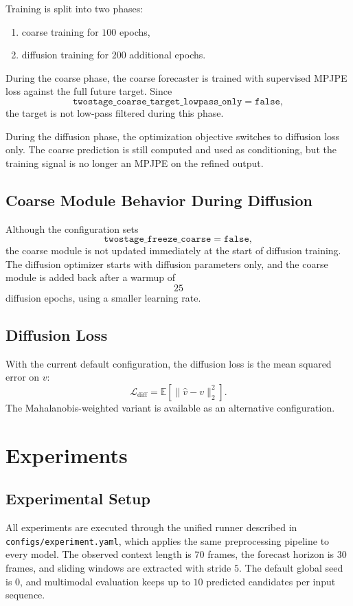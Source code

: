 \documentclass[11pt]{article}
\begin{document}
Training is split into two phases:

\begin{enumerate}
\item coarse training for $100$ epochs,
\item diffusion training for $200$ additional epochs.
\end{enumerate}

During the coarse phase, the coarse forecaster is trained with supervised MPJPE loss against the full future target. Since
\[
\texttt{twostage\_coarse\_target\_lowpass\_only} = \texttt{false},
\]
the target is not low-pass filtered during this phase.

During the diffusion phase, the optimization objective switches to diffusion loss only. The coarse prediction is still computed and used as conditioning, but the training signal is no longer an MPJPE on the refined output.

\subsection{Coarse Module Behavior During Diffusion}

Although the configuration sets
\[
\texttt{twostage\_freeze\_coarse} = \texttt{false},
\]
the coarse module is not updated immediately at the start of diffusion training. The diffusion optimizer starts with diffusion parameters only, and the coarse module is added back after a warmup of
\[
25
\]
diffusion epochs, using a smaller learning rate.

\subsection{Diffusion Loss}

With the current default configuration, the diffusion loss is the mean squared error on $v$:
\[
\mathcal{L}_{\mathrm{diff}} = \mathbb{E}\left[\| \hat{v} - v \|_2^2\right].
\]
The Mahalanobis-weighted variant is available as an alternative configuration.

\section{Experiments}

\subsection{Experimental Setup}

All experiments are executed through the unified runner described in
\texttt{configs/experiment.yaml}, which applies the same preprocessing
pipeline to every model. The observed context length is $70$ frames, the
forecast horizon is $30$ frames, and sliding windows are extracted with
stride $5$. The default global seed is $0$, and multimodal evaluation keeps
up to $10$ predicted candidates per input sequence.
\end{document}
